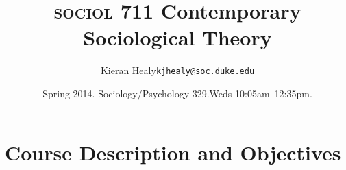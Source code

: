 \documentclass[11pt,article,oneside]{memoir}
\makeatletter
\def\myauthor{Author}
\def\mytitle{Title}
\def\mycopyright{\myauthor}
\def\myemail{kjhealy@soc.duke.edu}
\def\myauthor{Kieran Healy}
\def\mytitle{{\normalsize \textsc{sociol} 711\newline} \HUGE Contemporary Sociological Theory}
\makeatother
\begin{document}

\def\ind{\hangindent=1 true cm\hangafter=1 \noindent}
\def\labelitemi{$\cdot$}


\title{\LARGE \mytitle}     
\author{\Large\myauthor \newline \footnotesize\texttt{\noindent\myemail}}
\date{Spring 2014. Sociology/Psychology 329.\newline Weds 10:05am--12:35pm.}

\published{\,}

\maketitle

\thispagestyle{kjhgit}



%
%

\section{Course Description and Objectives}

\end{document}

